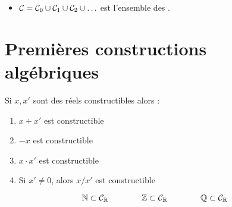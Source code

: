 \begin{frame}



\end{frame}

\begin{frame}
\begin{mydefinition}
\begin{itemize}
  \item $\mathcal{C} = \mathcal{C}_0 \cup \mathcal{C}_1 \cup \mathcal{C}_2 \cup \ldots$ 
  est l'ensemble des .

  
  
\end{itemize}
\end{mydefinition}


\end{frame}


\section{Premières constructions algébriques}

\begin{frame}
\begin{proposition}
\label{prop:cons}
Si $x, x'$ sont des réels constructibles alors :
\begin{enumerate}
 \pause
 \item $x+x'$ est constructible
 \pause 
 \item $-x$ est constructible
 \pause 
 \item $x \cdot x'$ est constructible
 \pause
 \item Si $x' \neq 0$, alors $x/x'$ est constructible
\end{enumerate}
\end{proposition}

 \pause

\begin{corollaire}
$$\mathbb{N} \subset \mathcal{C}_{\mathbb{R}} \qquad\qquad \mathbb{Z} \subset \mathcal{C}_{\mathbb{R}} \qquad\qquad \mathbb{Q} \subset \mathcal{C}_{\mathbb{R}}$$
\end{corollaire}


\end{frame}


